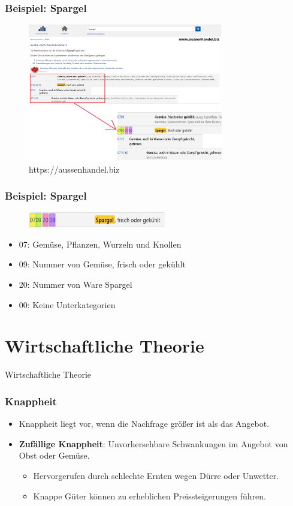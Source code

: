 \documentclass{beamer}
\begin{document}
\begin{frame}
\frametitle{Beispiel: Spargel}
  \begin{figure}[h]
    \centering
    \includegraphics[height=6cm]{wa-spargel}
    \caption{https://aussenhandel.biz}
  \end{figure}
\end{frame}

\begin{frame}
\frametitle{Beispiel: Spargel}
  \begin{figure}[h]
    \centering
    \includegraphics[width=6cm]{wa_spargel}
  \end{figure}

      \begin{itemize}
        \item
07: Gemüse, Pflanzen, Wurzeln und Knollen
        \item
09: Nummer von Gemüse, frisch oder gekühlt
        \item
20: Nummer von Ware Spargel
        \item
00: Keine Unterkategorien
      \end{itemize}
\end{frame}

\section{Wirtschaftliche Theorie} %
\begin{frame}
	\begin{center}
		{\Huge Wirtschaftliche Theorie}
	\end{center}
\end{frame}

\begin{frame}
\frametitle{Knappheit}
  \begin{itemize}
    \item
  Knappheit liegt vor, wenn die Nachfrage größer ist als
  das Angebot.
    \item
      \textbf{Zufällige Knappheit}: Unvorhersehbare Schwankungen
  im Angebot von Obst oder Gemüse.
      \begin{itemize}
        \item
  Hervorgerufen durch schlechte Ernten wegen Dürre oder
  Unwetter.
\item
Knappe Güter können zu erheblichen Preissteigerungen führen.
  \end{itemize}
      \end{itemize}
\end{frame}
\end{document}
